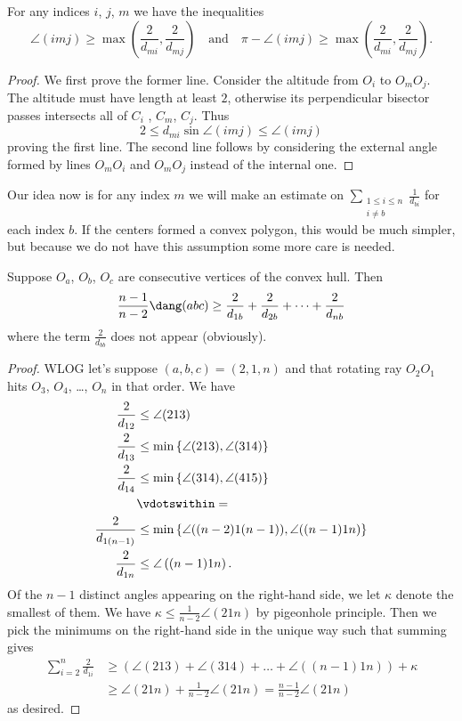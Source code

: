 \documentclass[11pt]{scrartcl}
\begin{document}
\begin{lemma*}
  For any indices $i$, $j$, $m$ we have the inequalities
  \[ \angle (imj) \ge
      \max \left( \frac{2}{d_{mi}}, \frac{2}{d_{mj}} \right)
      \quad\text{and}\quad
    \pi - \angle (imj) \ge
    \max \left( \frac{2}{d_{mi}}, \frac{2}{d_{mj}} \right). \]
\end{lemma*}
\begin{proof}
  We first prove the former line.
  Consider the altitude from $O_i$ to $O_m O_j$.
  The altitude must have length at least $2$,
  otherwise its perpendicular bisector passes
  intersects all of $C_i$ , $C_m$, $C_j$.
  Thus
  \[ 2 \le d_{mi} \sin \angle(imj) \le \angle(imj) \]
  proving the first line.
  The second line follows by considering the external
  angle formed by lines $O_m O_i$ and $O_m O_j$
  instead of the internal one.
\end{proof}

Our idea now is for any index $m$
we will make an estimate on
$\sum_{\substack{1 \le i \le n \\ i \neq b}} \frac{1}{d_{bi}}$
for each index $b$.
If the centers formed a convex polygon,
this would be much simpler,
but because we do not have this assumption some more care is needed.

\begin{claim*}
  Suppose $O_a$, $O_b$, $O_c$ are consecutive vertices
  of the convex hull.
  Then
  \[ \frac{n-1}{n-2} \dang(abc) \ge \frac{2}{d_{1b}} + \frac{2}{d_{2b}}
    + \dots + \frac{2}{d_{nb}} \]
  where the term $\frac{2}{d_{bb}}$ does not appear (obviously).
\end{claim*}

\begin{proof}
  WLOG let's suppose $(a,b,c) = (2,1,n)$ and
  that rotating ray $O_2 O_1$ hits $O_3$, $O_4$, \dots, $O_n$
  in that order.
  We have
  \begin{align*}
    \frac{2}{d_{12}} &\le \angle(213) \\
    \frac{2}{d_{13}} &\le \min \left\{ \angle(213), \angle(314) \right\} \\
    \frac{2}{d_{14}} &\le \min \left\{ \angle(314), \angle(415) \right\} \\
    &\vdotswithin=  \\
    \frac{2}{d_{1(n-1)}} &\le
      \min \left\{ \angle((n-2)1(n-1)), \angle((n-1)1n) \right\} \\
    \frac{2}{d_{1n}} &\le \angle\left( (n-1) 1 n \right).
  \end{align*}
  Of the $n-1$ distinct angles appearing on the right-hand side,
  we let $\kappa$ denote the smallest of them.
  We have $\kappa \le \frac{1}{n-2} \angle(21n)$
  by pigeonhole principle.
  Then we pick the minimums on the right-hand side in
  the unique way such that summing gives
  \begin{align*}
    \sum_{i=2}^n \frac{2}{d_{1i}}
    &\ge \left( \angle(213)+\angle(314)+\dots+\angle( (n-1)1n ) \right)
      + \kappa \\
    &\ge \angle(21n) + \frac{1}{n-2} \angle(21n) = \frac{n-1}{n-2} \angle(21n)
  \end{align*}
  as desired.
\end{proof}
\end{document}
